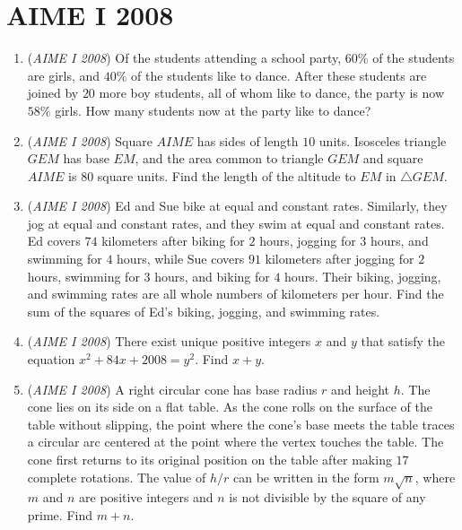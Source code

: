 \section{AIME I 2008}
        \begin{enumerate}
        	\item (\textit{AIME I 2008}) Of the students attending a school party, $60\%$ of the students are girls, and $40\%$ of the students like to dance. After these students are joined by $20$ more boy students, all of whom like to dance, the party is now $58\%$ girls. How many students now at the party like to dance?


 

	\item (\textit{AIME I 2008}) Square $AIME$ has sides of length $10$ units.  Isosceles triangle $GEM$ has base $EM$, and the area common to triangle $GEM$ and square $AIME$ is $80$ square units.  Find the length of the altitude to $EM$ in $\triangle GEM$.


 

	\item (\textit{AIME I 2008}) Ed and Sue bike at equal and constant rates.  Similarly, they jog at equal and constant rates, and they swim at equal and constant rates.  Ed covers $74$ kilometers after biking for $2$ hours, jogging for $3$ hours, and swimming for $4$ hours, while Sue covers $91$ kilometers after jogging for $2$ hours, swimming for $3$ hours, and biking for $4$ hours.  Their biking, jogging, and swimming rates are all whole numbers of kilometers per hour.  Find the sum of the squares of Ed's biking, jogging, and swimming rates.


 

	\item (\textit{AIME I 2008}) There exist unique positive integers $x$ and $y$ that satisfy the equation $x^2 + 84x + 2008 = y^2$. Find $x + y$.


 

	\item (\textit{AIME I 2008}) A right circular cone has base radius $r$ and height $h$.  The cone lies on its side on a flat table.  As the cone rolls on the surface of the table without slipping, the point where the cone's base meets the table traces a circular arc centered  at the point where the vertex touches the table.  The cone first returns to its original position on the table after making $17$ complete rotations.  The value of $h/r$ can be written in the form $m\sqrt {n}$, where $m$ and $n$ are positive integers and $n$ is not divisible by the square of any prime.  Find $m + n$.



\end{enumerate}
